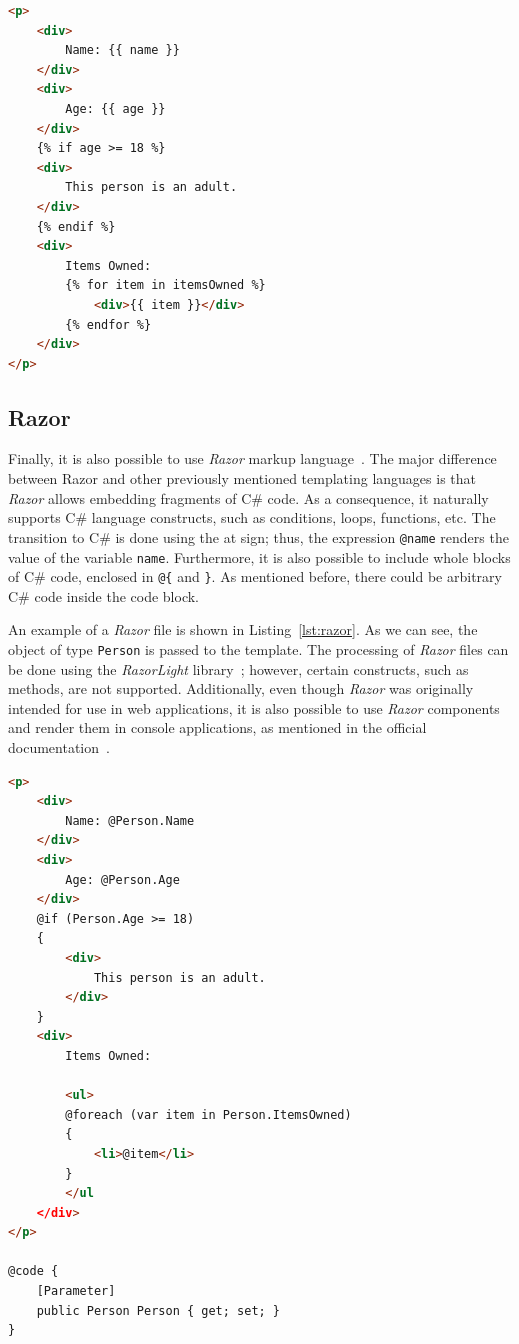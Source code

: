 \begin{listing}[H]
\begin{lstlisting}[language=HTML]
<p>
    <div>
        Name: {{ name }}
    </div>
    <div>
        Age: {{ age }}
    </div>
    {% if age >= 18 %}
    <div>
        This person is an adult.
    </div>
    {% endif %}
    <div>
        Items Owned:
        {% for item in itemsOwned %}
            <div>{{ item }}</div>
        {% endfor %}
    </div>
</p>
\end{lstlisting}
\caption{Example \textit{Liquid} template}
\label{lst:liquid}
\end{listing}

\subsection{Razor}

Finally, it is also possible to use \textit{Razor} markup language~\cite{razor}.
The major difference between Razor and other previously mentioned templating languages is that \textit{Razor} allows embedding fragments of C\# code.
As a consequence, it naturally supports C\# language constructs, such as conditions, loops, functions, etc.
The transition to C\# is done using the at sign; thus, the expression \texttt{@name} renders the value of the variable \texttt{name}.
Furthermore, it is also possible to include whole blocks of C\# code, enclosed in \texttt{@\{} and \texttt{\}}.
As mentioned before, there could be arbitrary C\# code inside the code block.

An example of a \textit{Razor} file is shown in Listing~\ref{lst:razor}.
As we can see, the object of type \texttt{Person} is passed to the template.
The processing of \textit{Razor} files can be done using the \textit{RazorLight} library~\cite{razorlight}; however, certain constructs, such as methods, are not supported.
Additionally, even though \textit{Razor} was originally intended for use in web applications, it is also possible
to use \textit{Razor} components and render them in console applications, as mentioned in the official documentation~\cite{razor_console}.

\begin{listing}[H]
\begin{lstlisting}[language=HTML]
<p>
    <div>
        Name: @Person.Name
    </div>
    <div>
        Age: @Person.Age
    </div>
    @if (Person.Age >= 18)
    {
        <div>
            This person is an adult.
        </div>
    } 
    <div>
        Items Owned:

        <ul>
        @foreach (var item in Person.ItemsOwned)
        {
            <li>@item</li>
        }
        </ul
    </div>
</p>

@code {
    [Parameter]
    public Person Person { get; set; }
}
\end{lstlisting}
\caption{Example \textit{Razor} template}
\label{lst:razor}
\end{listing}

